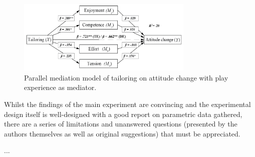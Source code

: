 \documentclass[11pt]{article}
\begin{document}
\begin{figure}[H]
\centering
\includegraphics[width=0.75\textwidth]{img/orji2017-tailoring-mediation-results.png} 
\caption{Parallel mediation model of tailoring on attitude change with play experience as mediator.}\label{fig:orji2017-tailoring-mediation-results}
\end{figure}

Whilst the findings of the main experiment are convincing and the experimental design itself is well-designed with a good report on parametric data gathered, there are a series of limitations and unanswered questions (presented by the authors themselves as well as original suggestions) that must be appreciated.

...


\newpage
\small

\normalsize
\end{document}

